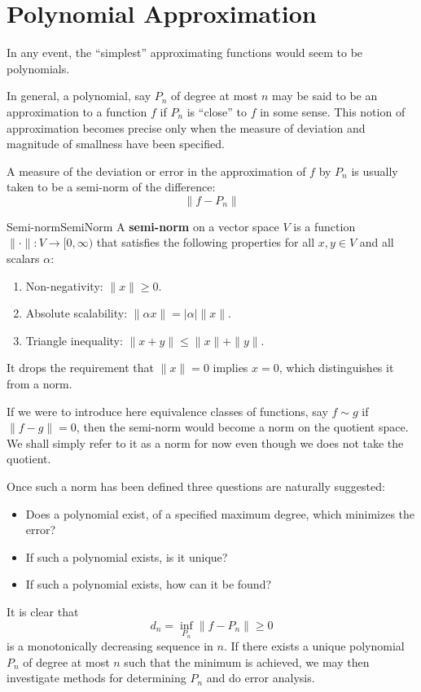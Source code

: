 \documentclass[../main.tex]{subfiles}
\begin{document}
\chapter{Polynomial Approximation}

In any event, the ``simplest'' approximating functions would seem to be polynomials.

In general, a polynomial, say $P_n$ of degree at most $n$ may be said to be an approximation to a function $f$ if $P_n$ is ``close'' to $f$ in some sense. This notion of approximation becomes precise only when the measure of deviation and magnitude of smallness have been specified.

A measure of the deviation or error in the approximation of $f$ by $P_n$ is usually taken to be a semi-norm of the difference:
\begin{equation}
	\| f - P_n \|
\end{equation}

\begin{definition}{Semi-norm}{SemiNorm}
	A \textbf{semi-norm} on a vector space $V$ is a function $\| \cdot \| : V \to [0, \infty)$ that satisfies the following properties for all $x, y \in V$ and all scalars $\alpha$:
	\begin{enumerate}
		\item Non-negativity: $\| x \| \geq 0$.
		\item Absolute scalability: $\| \alpha x \| = |\alpha| \| x \|$.
		\item Triangle inequality: $\| x + y \| \leq \| x \| + \| y \|$.
	\end{enumerate}
	It drops the requirement that $\| x \| = 0$ implies $x = 0$, which distinguishes it from a norm.
\end{definition}
If we were to introduce here equivalence classes of functions, say $f \sim g$ if $\| f - g \| = 0$, then the semi-norm would become a norm on the quotient space. We shall simply refer to it as a norm for now even though we does not take the quotient.

Once such a norm has been defined three questions are naturally suggested:
\begin{itemize}
	\item Does a polynomial exist, of a specified maximum degree, which minimizes the error?
	\item If such a polynomial exists, is it unique?
	\item If such a polynomial exists, how can it be found?
\end{itemize}
It is clear that
\begin{equation}
	d_n = \inf_{P_n} \| f - P_n \| \geq 0
\end{equation}
is a monotonically decreasing sequence in $n$. If there exists a unique polynomial $P_n$ of degree at most $n$ such that the minimum is achieved, we may then investigate methods for determining $P_n$ and do error analysis.
\end{document}
